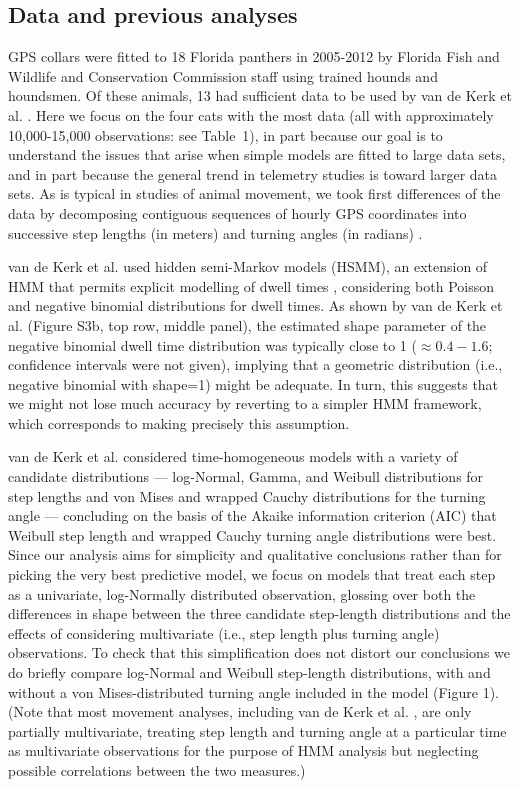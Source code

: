 \documentclass{bmcart}
\begin{document}
\subsection*{Data and previous analyses}


GPS collars were fitted to 18 Florida panthers in 2005-2012 by Florida
Fish and Wildlife and Conservation Commission staff using
trained hounds and houndsmen. Of these animals, 13 had 
sufficient data to be used by van de Kerk et al. \cite{kerk2015hidden}.
Here we focus on the four cats with the most data (all with approximately 10,000-15,000
observations: see Table~1), 
in part because our goal is to understand
the issues that arise when simple models are fitted to large data sets, and 
in part because the general trend in telemetry studies is toward larger data sets.  
As is typical in studies of animal movement, 
we took first differences of the data by decomposing
contiguous sequences of hourly GPS coordinates into 
successive step lengths (in meters) and turning angles (in radians)
\cite{turchin1998quantitative,kerk2015hidden}.


van de Kerk et al. \cite{kerk2015hidden} used hidden semi-Markov models (HSMM), 
an extension of HMM that permits explicit modelling of dwell times 
\cite{langrock_flexible_2012}, considering both Poisson and
negative binomial distributions for dwell times.  As shown 
by van de Kerk et al. \cite{kerk2015hidden} (Figure S3b, top row, middle panel),
the estimated shape parameter of the negative binomial dwell time
distribution was typically close to 1 ($\approx 0.4-1.6$; confidence
intervals were not given), implying that a geometric distribution
(i.e., negative binomial with shape=1) might be adequate. In turn,
this suggests that we might not lose much accuracy by reverting to 
a simpler HMM framework, which corresponds
to making precisely this assumption.


van de Kerk et al. \cite{kerk2015hidden} considered time-homogeneous models with 
a variety of candidate distributions %
--- log-Normal, Gamma, and Weibull distributions for step lengths
and von Mises and wrapped Cauchy distributions for the turning angle --- %
concluding on the basis of the Akaike information criterion (AIC) 
that Weibull step length and wrapped Cauchy turning angle distributions
were best.  
Since our analysis aims for simplicity and qualitative
conclusions rather than for picking the very best
predictive model, we focus on models that treat each step as
a univariate, log-Normally distributed observation, glossing
over both the differences in shape between
the three candidate step-length distributions and the effects
of considering multivariate (i.e., step length plus turning angle)
observations.  To check that this simplification
does not distort our conclusions
we do briefly compare log-Normal and Weibull
step-length distributions, with and without 
a von Mises-distributed turning angle included in the model (Figure 1).
(Note that most movement analyses, including van de Kerk et al.
\cite{kerk2015hidden}, are only partially multivariate, 
treating step length and turning angle at a particular time
as multivariate observations for the purpose of HMM
analysis but neglecting possible correlations
between the two measures.) 
\end{document}

